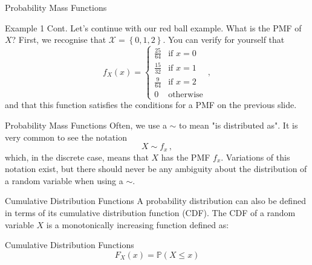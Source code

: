 \documentclass[10pt]{beamer}
\begin{document}
\begin{frame}[fragile]{Probability Mass Functions}
\begin{exampleblock}{Example 1 Cont.}
Let's continue with our red ball example. What is the PMF of \(X\)? First, we recognise that \(\mathcal{X} = \left\{0, 1, 2\right\}\). You can verify for yourself that
\begin{equation*}
    f_X\left(x\right) =
    \begin{cases}
        \frac{25}{64} & \text{if } x = 0\\
        \frac{15}{32} & \text{if } x = 1\\
        \frac{9}{64} & \text{if } x = 2\\
        0 & \text{otherwise}
    \end{cases}\,,
\end{equation*}
and that this function satisfies the conditions for a PMF on the previous slide.
\end{exampleblock}
\end{frame}

\begin{frame}[fragile]{Probability Mass Functions}
Often, we use a \(\sim\) to mean "is distributed as". It is very common to see the notation
\begin{equation*}
    X \sim f_x\,,
\end{equation*}
which, in the discrete case, means that \(X\) has the PMF \(f_x\). Variations of this notation exist, but there should never be any ambiguity about the distribution of a random variable when using a \(\sim\).

\end{frame}

\begin{frame}[fragile]{Cumulative Distribution Functions}
A probability distribution can also be defined in terms of its cumulative distribution function (CDF). The CDF of a random variable \(X\) is a monotonically increasing function defined as:
\begin{alertblock}{Cumulative Distribution Functions}
\begin{equation*}
    F_X\left(x\right) = \mathbb{P}\left(X \leq x\right)
\end{equation*}
\end{alertblock}
\end{frame}
\end{document}
